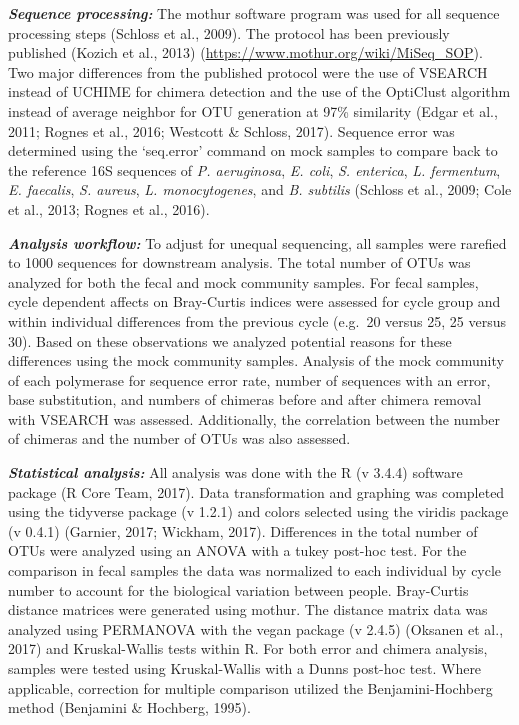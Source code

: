 \documentclass[11pt,]{article}
\begin{document}
\textbf{\emph{Sequence processing:}} The mothur software program was
used for all sequence processing steps (Schloss et al., 2009). The
protocol has been previously published (Kozich et al., 2013)
(\url{https://www.mothur.org/wiki/MiSeq_SOP}). Two major differences
from the published protocol were the use of VSEARCH instead of UCHIME
for chimera detection and the use of the OptiClust algorithm instead of
average neighbor for OTU generation at 97\% similarity (Edgar et al.,
2011; Rognes et al., 2016; Westcott \& Schloss, 2017). Sequence error
was determined using the `seq.error' command on mock samples to compare
back to the reference 16S sequences of \emph{P. aeruginosa}, \emph{E.
coli}, \emph{S. enterica}, \emph{L. fermentum}, \emph{E. faecalis},
\emph{S. aureus}, \emph{L. monocytogenes}, and \emph{B. subtilis}
(Schloss et al., 2009; Cole et al., 2013; Rognes et al., 2016).

\textbf{\emph{Analysis workflow:}} To adjust for unequal sequencing, all
samples were rarefied to 1000 sequences for downstream analysis. The
total number of OTUs was analyzed for both the fecal and mock community
samples. For fecal samples, cycle dependent affects on Bray-Curtis
indices were assessed for cycle group and within individual differences
from the previous cycle (e.g.~20 versus 25, 25 versus 30). Based on
these observations we analyzed potential reasons for these differences
using the mock community samples. Analysis of the mock community of each
polymerase for sequence error rate, number of sequences with an error,
base substitution, and numbers of chimeras before and after chimera
removal with VSEARCH was assessed. Additionally, the correlation between
the number of chimeras and the number of OTUs was also assessed.

\textbf{\emph{Statistical analysis:}} All analysis was done with the R
(v 3.4.4) software package (R Core Team, 2017). Data transformation and
graphing was completed using the tidyverse package (v 1.2.1) and colors
selected using the viridis package (v 0.4.1) (Garnier, 2017; Wickham,
2017). Differences in the total number of OTUs were analyzed using an
ANOVA with a tukey post-hoc test. For the comparison in fecal samples
the data was normalized to each individual by cycle number to account
for the biological variation between people. Bray-Curtis distance
matrices were generated using mothur. The distance matrix data was
analyzed using PERMANOVA with the vegan package (v 2.4.5) (Oksanen et
al., 2017) and Kruskal-Wallis tests within R. For both error and chimera
analysis, samples were tested using Kruskal-Wallis with a Dunns post-hoc
test. Where applicable, correction for multiple comparison utilized the
Benjamini-Hochberg method (Benjamini \& Hochberg, 1995).
\end{document}
